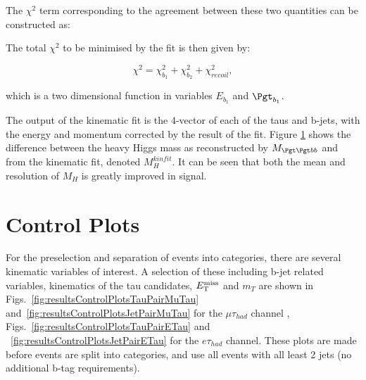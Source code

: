 The $\chi^{2}$ term corresponding to the agreement between these two quantities
can be constructed as:


The total $\chi^{2}$ to be minimised by the fit is then given by:

\begin{equation}
\chi^{2}= \chi_{b_{1}}^{2} + \chi_{b_{2}}^{2} + \chi_{recoil}^{2},
\end{equation}

which is a two dimensional function in variables $E_{b_{1}}$ and $\Pgt_{b_{1}}$.

The output of the kinematic fit is the 4-vector of each of the taus and b-jets,
with the energy and momentum corrected by the result of the fit. Figure \ref{}
shows the difference between the heavy Higgs mass as reconstructed by
$M_{\Pgt\Pgt bb}$ and from the kinematic fit, denoted $M_{H}^{kinfit}$. It can
be seen that both the mean and resolution of $M_{H}$ is greatly improved in
signal.

\section{Control Plots}

For the preselection and separation of events into categories, there are several
kinematic variables of interest. A selection of these including b-jet related
variables, kinematics of the tau candidates, $E_{\mathrm{T}}^{\text{miss}}$ and $m_{T}$ are shown in
Figs.~\ref{fig:resultsControlPlotsTauPairMuTau}
and~\ref{fig:resultsControlPlotsJetPairMuTau} for the $\mu\tau_{had}$ channel
, Figs.~\ref{fig:resultsControlPlotsTauPairETau} and
~\ref{fig:resultsControlPlotsJetPairETau} for the $e\tau_{had}$ channel.
These plots are made before events are split into categories, and use all events
with all least 2 jets (no additional b-tag requirements).


